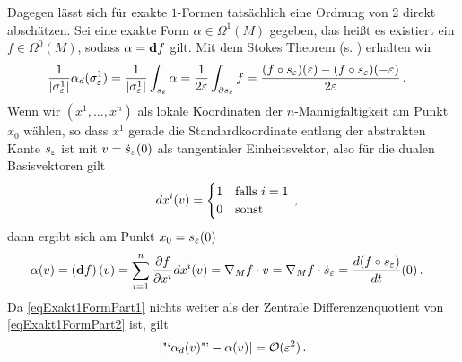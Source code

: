 \begin{bemerkung}
    Dagegen lässt sich für exakte \( 1 \)-Formen tatsächlich eine Ordnung von 2 direkt abschätzen.
    Sei eine exakte Form \( \alpha\in\Omega^{1}(M) \) gegeben, das heißt es existiert ein \( f\in\Omega^{0}(M) \), sodass \( \alpha= \mathbf{d} f \) gilt.
    Mit dem Stokes Theorem (s. \cite[Kap. 7.2]{Marsden}) erhalten wir
    \begin{align}
    \label{eqExakt1FormPart1}
      \frac{1}{|\sigma^{1}_{\varepsilon}|} \alpha_{d}(\sigma_{\varepsilon}^{1}) &= \frac{1}{|\sigma^{1}_{\varepsilon}|}\int_{s_{\varepsilon}}\alpha 
                                                                   = \frac{1}{2\varepsilon}\int_{\partial s_{\varepsilon}} f
                                                                   = \frac{(f\circ s_{\varepsilon})(\varepsilon) - (f\circ s_{\varepsilon})(-\varepsilon)}{2\varepsilon} \,\text{.}
    \end{align}
    Wenn wir \( \left( x^{1},\ldots,x^{n} \right) \) als lokale Koordinaten der \( n \)-Mannigfaltigkeit am Punkt \( x_{0} \) wählen, 
    so dass \( x^{1} \) gerade die Standardkoordinate entlang der abstrakten Kante \( s_{\varepsilon} \) ist mit \( v=\dot{s}_{\varepsilon}(0) \) als tangentialer Einheitsvektor,
    also für die dualen Basisvektoren gilt 
    \begin{align}
      dx^{i}(v) &= \begin{cases}
                      1 & \text{falls } i=1 \\
                      0 & \text{sonst}
                  \end{cases} \,\text{,}
    \end{align}
    dann ergibt sich am Punkt \( x_{0}= s_{\varepsilon}(0) \)
    \begin{align}
    \label{eqExakt1FormPart2}
      \begin{aligned}
        \alpha(v) &= \left( \mathbf{d} f \right)(v) = \sum_{i=1}^{n}\frac{\partial f}{\partial x^{i}} dx^{i}(v)
                   = \nabla_{M}f \cdot v
                   = \nabla_{M}f \cdot \dot{s}_{\varepsilon}
                   = \frac{d (f\circ s_{\varepsilon})}{dt}(0) \,\text{.}
      \end{aligned}
    \end{align}
    Da \eqref{eqExakt1FormPart1} nichts weiter als der Zentrale Differenzenquotient von \eqref{eqExakt1FormPart2} ist, gilt
    \begin{align}
      \left| \text{"`}\alpha_{d}(v)\text{"'} - \alpha(v) \right| = \mathcal{O}(\varepsilon^{2}) \,\text{.}
    \end{align}


\end{bemerkung}
